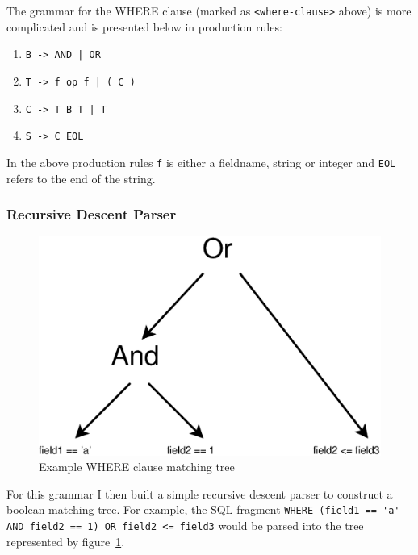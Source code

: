 \documentclass[12pt,twoside,notitlepage]{report}
\begin{document}
The grammar for the WHERE clause (marked as \verb+<where-clause>+ above) is more complicated and
is presented below in production rules:
\begin{enumerate}
\item \verb+B -> AND | OR+
\item \verb+T -> f op f | ( C )+
\item \verb+C -> T B T | T+
\item \verb+S -> C EOL+
\end{enumerate}

In the above production rules \verb+f+ is either a fieldname, string or integer and \verb+EOL+
refers to the end of the string.

\subsubsection{Recursive Descent Parser}

\begin{figure}[htb]
\centering
\includegraphics[scale=0.5]{figs/where-ast.eps}
\caption{\label{fig:where-ast}Example WHERE clause matching tree}
\end{figure}

For this grammar I then built a simple recursive descent parser to construct a boolean matching
tree. For example, the SQL fragment \verb+WHERE (field1 == 'a' AND field2 == 1) OR field2 <= field3+
would be parsed into the tree represented by figure~\ref{fig:where-ast}.

%
%
%
\end{document}
